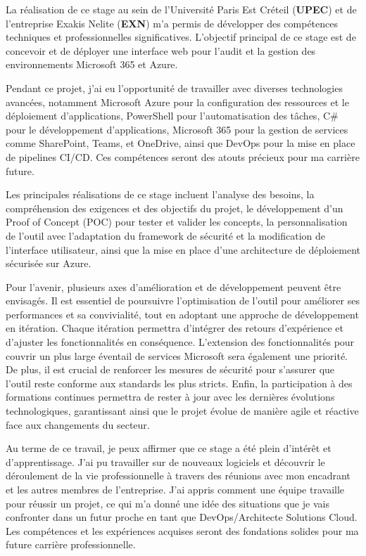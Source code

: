La réalisation de ce stage au sein de l’Université Paris Est Créteil (\textbf{UPEC}) et de l’entreprise Exakis Nelite (\textbf{EXN}) m’a permis de développer des compétences techniques et professionnelles significatives. L'objectif principal de ce stage est de concevoir et de déployer une interface web pour l’audit et la gestion des environnements Microsoft 365 et Azure. 

Pendant ce projet, j’ai eu l’opportunité de travailler avec diverses technologies avancées, notamment Microsoft Azure pour la configuration des ressources et le déploiement d’applications, PowerShell pour l’automatisation des tâches, C\# pour le développement d’applications, Microsoft 365 pour la gestion de services comme SharePoint, Teams, et OneDrive, ainsi que DevOps pour la mise en place de pipelines CI/CD. Ces compétences seront des atouts précieux pour ma carrière future.

Les principales réalisations de ce stage incluent l’analyse des besoins, la compréhension des exigences et des objectifs du projet, le développement d’un Proof of Concept (POC) pour tester et valider les concepts, la personnalisation de l’outil avec l’adaptation du framework de sécurité et la modification de l’interface utilisateur, ainsi que la mise en place d’une architecture de déploiement sécurisée sur Azure.

Pour l’avenir, plusieurs axes d’amélioration et de développement peuvent être envisagés. Il est essentiel de poursuivre l’optimisation de l’outil pour améliorer ses performances et sa convivialité, tout en adoptant une approche de développement en itération. Chaque itération permettra d'intégrer des retours d'expérience et d'ajuster les fonctionnalités en conséquence. L’extension des fonctionnalités pour couvrir un plus large éventail de services Microsoft sera également une priorité. De plus, il est crucial de renforcer les mesures de sécurité pour s’assurer que l’outil reste conforme aux standards les plus stricts. Enfin, la participation à des formations continues permettra de rester à jour avec les dernières évolutions technologiques, garantissant ainsi que le projet évolue de manière agile et réactive face aux changements du secteur.

Au terme de ce travail, je peux affirmer que ce stage a été plein d’intérêt et d'apprentissage. J'ai pu travailler sur de nouveaux logiciels et découvrir le déroulement de la vie professionnelle à travers des réunions avec mon encadrant et les autres membres de l’entreprise. J'ai appris comment une équipe travaille pour réussir un projet, ce qui m'a donné une idée des situations que je vais confronter dans un futur proche en tant que DevOps/Architecte Solutions Cloud. Les compétences et les expériences acquises seront des fondations solides pour ma future carrière professionnelle.
